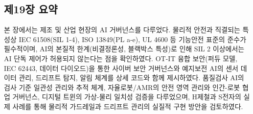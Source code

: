\subsection*{제19장 요약}

본 장에서는 제조 및 산업 현장의 AI 거버넌스를 다루었다. 물리적 안전과 직결되는 특성상 IEC 61508(SIL 1-4), ISO 13849(PL a-e), UL 4600 등 기능안전 표준의 준수가 필수적이며, AI의 본질적 한계(비결정론성, 블랙박스 특성)로 인해 SIL 2 이상에서는 AI 단독 제어가 허용되지 않는다는 점을 확인하였다. OT-IT 융합 보안(퍼듀 모델, IEC 62443, 데이터 다이오드)을 통한 사이버 보안 거버넌스와 예지보전 AI의 센서 데이터 관리, 드리프트 탐지, 알림 체계를 상세 코드와 함께 제시하였다. 품질검사 AI의 검사 기준 일관성 관리와 추적 체계, 자율로봇/AMR의 안전 영역 관리와 인간-로봇 협업 거버넌스, 디지털 트윈의 가상-물리 일치성 검증을 다루었으며, H제철과 S전자의 실제 사례를 통해 물리적 가드레일과 드리프트 관리의 실질적 구현 방안을 검토하였다.

